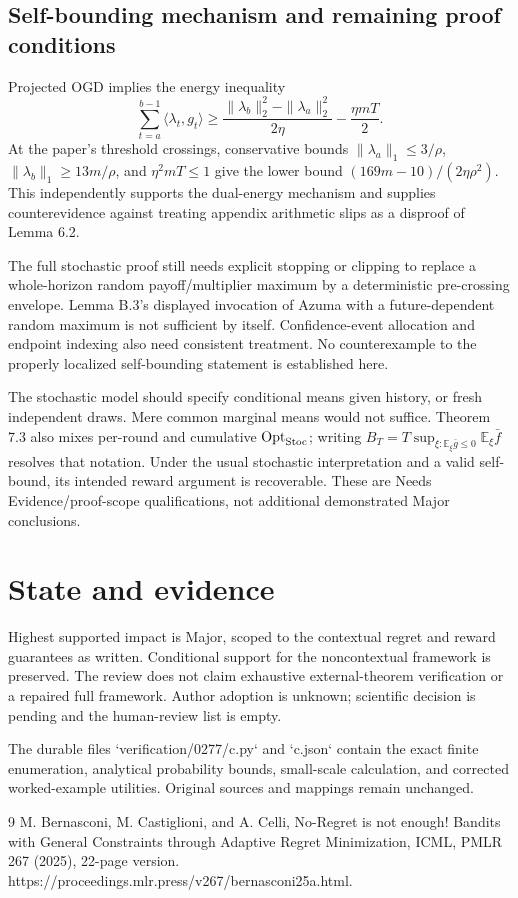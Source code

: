 \documentclass[10pt]{article}
\begin{document}
\subsection*{Self-bounding mechanism and remaining proof conditions}
Projected OGD implies the energy inequality \[\sum_{t=a}^{b-1}\langle\lambda_t,g_t\rangle
 \ge\frac{\|\lambda_b\|_2^2-\|\lambda_a\|_2^2}{2\eta}
       -\frac{\eta mT}{2}.\] At the paper’s threshold crossings, conservative bounds \(\|\lambda_a\|_1\le3/\rho\), \(\|\lambda_b\|_1\ge13m/\rho\), and \(\eta^2mT\le1\) give the lower bound \((169m-10)/(2\eta\rho^2)\). This independently supports the dual-energy mechanism and supplies counterevidence against treating appendix arithmetic slips as a disproof of Lemma 6.2.\par
The full stochastic proof still needs explicit stopping or clipping to replace a whole-horizon random payoff/multiplier maximum by a deterministic pre-crossing envelope. Lemma B.3’s displayed invocation of Azuma with a future-dependent random maximum is not sufficient by itself. Confidence-event allocation and endpoint indexing also need consistent treatment. No counterexample to the properly localized self-bounding statement is established here.\par
The stochastic model should specify conditional means given history, or fresh independent draws. Mere common marginal means would not suffice. Theorem 7.3 also mixes per-round and cumulative \(\operatorname{Opt}_{\rm Stoc}\); writing \(B_T=T\sup_{\xi:\mathbb E_\xi\bar g\le0}\mathbb E_\xi\bar f\) resolves that notation. Under the usual stochastic interpretation and a valid self-bound, its intended reward argument is recoverable. These are Needs Evidence/proof-scope qualifications, not additional demonstrated Major conclusions.\par
\section*{State and evidence}
Highest supported impact is Major, scoped to the contextual regret and reward guarantees as written. Conditional support for the noncontextual framework is preserved. The review does not claim exhaustive external-theorem verification or a repaired full framework. Author adoption is unknown; scientific decision is pending and the human-review list is empty.\par
The durable files `verification/0277/c.py` and `c.json` contain the exact finite enumeration, analytical probability bounds, small-scale calculation, and corrected worked-example utilities. Original sources and mappings remain unchanged.\par
9 M. Bernasconi, M. Castiglioni, and A. Celli, No-Regret is not enough! Bandits with General Constraints through Adaptive Regret Minimization, ICML, PMLR 267 (2025), 22-page version. https://proceedings.mlr.press/v267/bernasconi25a.html.\par
\end{document}
